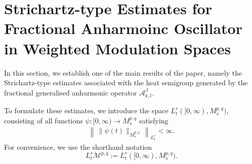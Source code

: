 \documentclass[12pt,reqno,a4paper]{amsart}
\numberwithin{equation}{section}
\theoremstyle{plain}
\theoremstyle{definition}
\theoremstyle{remark}
\def\M{\mathcal{M}}
\def \Ad{\mathcal{A}_{k,l}}
\def \M{{\mathcal M}}
\begin{document}
\section{Strichartz-type Estimates for Fractional Anharmoinc Oscillator in Weighted Modulation Spaces }
In this section, we establish one of the main results of the paper, namely the Strichartz-type estimates associated with the heat semigroup generated by the fractional generalised anharmonic operator \(\Ad^{\beta}\).

To formulate these estimates, we introduce the space \(L^{r}_{t}([0,\infty), M^{p,q}_{s})\), consisting of all functions \(\psi:[0,\infty)\to M^{p,q}_{s}\) satisfying
\begin{align*}
\left\|\, \|\psi(t)\|_{M^{p,q}_{s}}\, \right\|_{L^{r}_{t}}<\infty.
\end{align*}
For convenience, we use the shorthand notation
\[
L^{r}_{t}\M^{p,q}:=L^{r}_{t}([0,\infty),M^{p,q}_{s}).
\]
\end{document}
